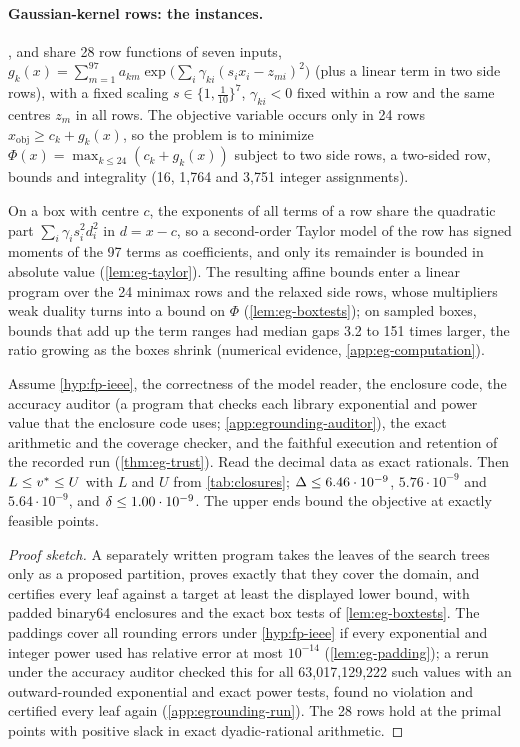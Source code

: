 \paragraph{Gaussian-kernel rows: the  instances.}
,  and  share 28 row functions of seven inputs, $g_k(x)=\sum_{m=1}^{97}a_{km}\exp\bigl(\sum_{i}\gamma_{ki}(s_ix_i-z_{mi})^2\bigr)$ (plus a linear term in two side rows), with a fixed scaling $s\in\{1,\frac1{10}\}^7$, $\gamma_{ki}<0$ fixed within a row and the same centres $z_m$ in all rows.
The objective variable occurs only in 24 rows $x_{\mathrm{obj}}\ge c_k+g_k(x)$, so the problem is to minimize $\Phi(x)=\max_{k\le24}(c_k+g_k(x))$ subject to two side rows, a two-sided row, bounds and integrality (16, 1{,}764 and 3{,}751 integer assignments).

On a box with centre $c$, the exponents of all terms of a row share the quadratic part $\sum_i\gamma_is_i^2d_i^2$ in $d=x-c$, so a second-order Taylor model of the row has signed moments of the 97 terms as coefficients, and only its remainder is bounded in absolute value (\cref{lem:eg-taylor}).
The resulting affine bounds enter a linear program over the 24 minimax rows and the relaxed side rows, whose multipliers weak duality turns into a bound on $\Phi$ (\cref{lem:eg-boxtests}); on sampled boxes, bounds that add up the term ranges had median gaps 3.2 to 151 times larger, the ratio growing as the boxes shrink (numerical evidence, \cref{app:eg-computation}).

\begin{theorem}\label{thm:eg-bounds}
Assume \cref{hyp:fp-ieee}, the correctness of the model reader, the enclosure code, the accuracy auditor (a program that checks each library exponential and power value that the enclosure code uses; \cref{app:egrounding-auditor}), the exact arithmetic and the coverage checker, and the faithful execution and retention of the recorded run (\cref{thm:eg-trust}).
Read the decimal data as exact rationals. Then $L\le v^{*}\le U$ with $L$ and $U$ from \cref{tab:closures}; $\Delta\le6.46\cdot10^{-9}$, $5.76\cdot10^{-9}$ and $5.64\cdot10^{-9}$, and $\delta\le1.00\cdot10^{-9}$.
The upper ends bound the objective at exactly feasible points.
\end{theorem}

\begin{proof}[Proof sketch]
A separately written program takes the leaves of the search trees only as a proposed partition, proves exactly that they cover the domain, and certifies every leaf against a target at least the displayed lower bound, with padded binary64 enclosures and the exact box tests of \cref{lem:eg-boxtests}.
The paddings cover all rounding errors under \cref{hyp:fp-ieee} if every exponential and integer power used has relative error at most $10^{-14}$ (\cref{lem:eg-padding}); a rerun under the accuracy auditor checked this for all 63{,}017{,}129{,}222 such values with an outward-rounded exponential and exact power tests, found no violation and certified every leaf again (\cref{app:egrounding-run}).
The 28 rows hold at the primal points with positive slack in exact dyadic-rational arithmetic.
\end{proof}

